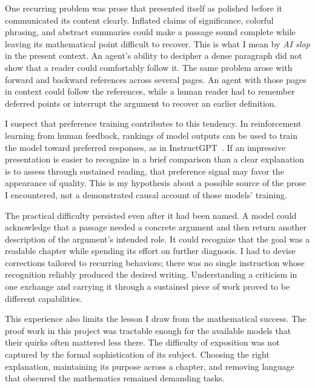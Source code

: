One recurring problem was prose that presented itself as polished before it
communicated its content clearly. Inflated claims of significance, colorful
phrasing, and abstract summaries could make a passage sound complete while
leaving its mathematical point difficult to recover. This is what I mean by
\emph{AI slop} in the present context. An agent's ability to decipher a dense
paragraph did not show that a reader could comfortably follow it. The same
problem arose with forward and backward references across several pages.
An agent with those pages in context could follow the references, while a
human reader had to remember deferred points or interrupt the argument to
recover an earlier definition.

I suspect that preference training contributes to this tendency. In
reinforcement learning from human feedback, rankings of model outputs can
be used to train the model toward preferred responses, as in
InstructGPT~\cite{aiOuyang2022}. If an impressive presentation is easier to
recognize in a brief comparison than a clear explanation is to assess
through sustained reading, that preference signal may favor the appearance
of quality. This is my hypothesis about a possible source of the prose I
encountered, not a demonstrated causal account of those models' training.

The practical difficulty persisted even after it had been named. A model
could acknowledge that a passage needed a concrete argument and then return
another description of the argument's intended role. It could recognize
that the goal was a readable chapter while spending its effort on further
diagnosis. I had to devise corrections tailored to recurring behaviors;
there was no single instruction whose recognition reliably produced the
desired writing. Understanding a criticism in one exchange and carrying it
through a sustained piece of work proved to be different capabilities.

This experience also limits the lesson I draw from the mathematical success.
The proof work in this project was tractable enough for the available models
that their quirks often mattered less there. The difficulty of exposition
was not captured by the formal sophistication of its subject. Choosing the
right explanation, maintaining its purpose across a chapter, and removing
language that obscured the mathematics remained demanding tasks.
